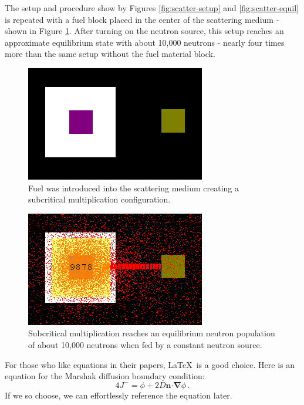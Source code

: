 \documentclass{anstrans}
\renewcommand{\vec}[1]{\bm{#1}} %
\newcommand{\vd}{\bm{\cdot}} %
\newcommand{\grad}{\vec{\nabla}} %
\begin{document}
The setup and procedure show by Figures \ref{fig:scatter-setup} and
\ref{fig:scatter-equil} is repeated with a fuel block placed in the center of
the scattering medium - shown in Figure \ref{fig:subcrit-setup}.  After
turning on the neutron source, this setup reaches an approximate equilibrium
state with about 10,000 neutrons - nearly four times more than the same setup
without the fuel material block.

\begin{figure}
    \centering
    \includegraphics{subcrit-mult-setup.png}
    \caption{Fuel was introduced into the scattering medium creating a subcritical multiplication configuration.}
    \label{fig:subcrit-setup}
\end{figure}

\begin{figure}
    \centering
    \includegraphics{subcrit-mult-equil.png}
    \caption{Subcritical multiplication reaches an equilibrium neutron population of about 10,000 neutrons when fed by a constant neutron source.}
    \label{fig:subcrit-equil}
\end{figure}

For those who like equations in their papers, \LaTeX\ is a good choice. Here is
an equation for the Marshak diffusion boundary condition:
\begin{equation} \label{eq:marshak}
  4 J^- = \phi + 2 D \vec{n} \vd \grad \phi \,.
\end{equation}
If we so choose, we can effortlessly reference the equation later.
\end{document}
